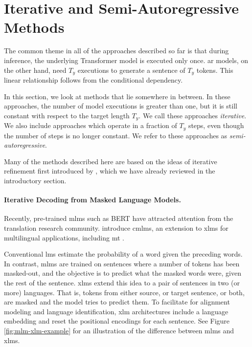 \section{Iterative and Semi-Autoregressive Methods}%
\label{sec:nat:semi}

The common theme in all of the approaches described so far is that during
inference, the underlying Transformer model is executed only once.  \Acl{ar}
models, on the other hand, need $T_y$ executions to generate a sentence of
$T_y$ tokens. This linear relationship follows from the conditional dependency.

In this section, we look at methods that lie somewhere in between. In these
approaches, the number of model executions is greater than one, but it is still
constant with respect to the target length $T_y$. We call these approaches
\emph{iterative}. We also include approaches which operate in a fraction of
$T_y$ steps, even though the number of steps is no longer constant. We refer to
these approaches as \emph{semi-autoregressive}.

Many of the methods described here are based on the ideas of iterative
refinement first introduced by \citet{lee-etal-2018-deterministic}, which we
have already reviewed in the introductory section.

\paragraph{Iterative Decoding from Masked Language Models.} Recently,
pre-trained \acp{mlm} such as BERT \citep{devlin-etal-2019-bert} have attracted
attention from the translation research
community. \citet{ghazvininejad-etal-2019-mask} introduce
\acfp{cmlm}, an extension to \acp{xlm} for multilingual
applications, including \ac{mt} \citep{conneau-lample-2019-cross}.

Conventional \acp{lm} estimate the probability of a word given the preceding
words.  In contrast, \acp{mlm} are trained on sentences where a number of
tokens has been masked-out, and the objective is to predict what the masked
words were, given the rest of the sentence. \Acp{xlm} extend this idea to a
pair of sentences in two (or more) languages. That is, tokens from either
source, or target sentence, or both, are masked and the model tries to predict
them.  To facilitate for alignment modeling and language identification,
\ac{xlm} architectures include a language embedding and reset the positional
encodings for each sentence. See Figure \ref{fig:mlm-xlm-example} for an
illustration of the difference between \acp{mlm} and \acp{xlm}.


